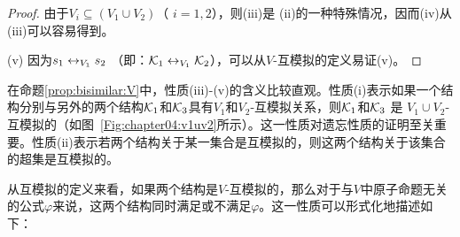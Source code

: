 \begin{proof}
	由于$V_i \subseteq (V_1 \cup V_2)$（ $i = 1, 2$），则(iii)是 (ii)的一种特殊情况，因而(iv)从(iii)可以容易得到。
	
	(v) 因为$s_1 \leftrightarrow_{V_1} s_2$ （即：${\cal K}_1\leftrightarrow_{V_1}{\cal K}_2$），可以从$V$-互模拟的定义易证(v)。	
\end{proof}


在命题\ref{prop:bisimilar:V}中，性质(iii)-(v)的含义比较直观。性质(i)表示如果一个结构分别与另外的两个结构${\cal K}_1$和${\cal K}_3$具有$V_1$和$V_2$-互模拟关系，则${\cal K}_1$和${\cal K}_3$ 是 $V_1\cup V_2$-互模拟的（如图~\ref{Fig:chapter04:v1uv2}所示）。这一性质对遗忘性质的证明至关重要。性质(ii)表示若两个结构关于某一集合是互模拟的，则这两个结构关于该集合的超集是互模拟的。

从互模拟的定义来看，如果两个结构是$V$-互模拟的，那么对于与$V$中原子命题无关的公式$\varphi$来说，这两个结构同时满足或不满足$\varphi$。这一性质可以形式化地描述如下：

